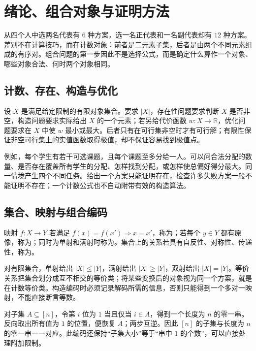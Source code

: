\documentclass[UTF8,12pt,a4paper,fontset=fandol]{ctexbook}
\begin{document}
\mainmatter

\chapter{绪论、组合对象与证明方法}
\label{ch:objects}

从四个人中选两名代表有 $6$ 种方案，选一名正代表和一名副代表却有 $12$ 种方案。差别不在计算技巧，而在计数对象：前者是二元素子集，后者是由两个不同元素组成的有序对。组合问题的第一步因此不是选择公式，而是确定什么算作一个对象、哪些对象合法、何时两个对象相同。

\section{计数、存在、构造与优化}

设 $X$ 是满足给定限制的有限对象集合。要求 $|X|$，存在性问题要求判断 $X$ 是否非空，构造问题要求实际给出 $X$ 的一个元素；若另给代价函数 $w:X\to\mathbb R$，优化问题要求在 $X$ 中使 $w$ 最小或最大。后者只有在可行集非空时才有可行解；有限性保证非空可行集上的实值函数取得极值，却不保证容易找到极值点。

例如，每个学生有若干可选课题，且每个课题至多分给一人。可以问合法分配的数量、是否存在覆盖所有学生的分配、怎样找到分配，或怎样使总偏好得分最大。同一情境产生四个不同任务。给出一个方案只能证明存在，检查许多失败方案一般不能证明不存在；一个计数公式也不自动附带有效的构造算法。

\section{集合、映射与组合编码}

\begin{definition}
映射 $f:X\to Y$ 若满足 $f(x)=f(x')\Rightarrow x=x'$，称为；若每个 $y\in Y$ 都有原像，称为；同时为单射和满射时称为。集合上的关系若具有自反性、对称性、传递性，称为。
\end{definition}

对有限集合，单射给出 $|X|\le|Y|$，满射给出 $|X|\ge|Y|$，双射给出 $|X|=|Y|$。等价关系把集合划分成互不相交的等价类；将某些变换后的对象视为同一个方案，就是在计数等价类。构造编码时必须记录解码所需的信息，否则只能得到一个多对一映射，不能直接断言等数。

\begin{example}[子集与零一串]
对子集 $A\subseteq[n]$，令第 $i$ 位为 $1$ 当且仅当 $i\in A$，得到一个长度为 $n$ 的零一串。反向取出所有值为 $1$ 的位置，便恢复 $A$；两步互逆。因此 $[n]$ 的子集与长度为 $n$ 的零一串一一对应。此编码还保持“子集大小”等于“串中 $1$ 的个数”，可以直接处理附加限制。
\end{example}
\end{document}
